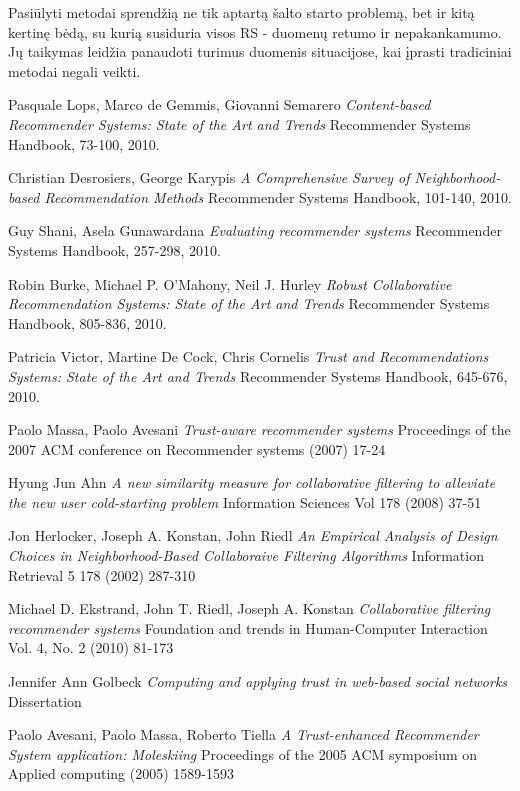 \documentclass{VUMIFInfMagistrinis}
\begin{document}
\newline
\indent
Pasiūlyti metodai sprendžią ne tik aptartą šalto starto problemą, bet ir kitą kertinę bėdą, su kurią susiduria visos RS - duomenų retumo ir nepakankamumo. Jų taikymas leidžia panaudoti turimus duomenis situacijose, kai įprasti tradiciniai metodai negali veikti.
\newpage
\begin{thebibliography}{9}
Pasquale Lops, Marco de Gemmis, Giovanni Semarero
\textit{Content-based Recommender Systems: State of the Art and Trends}
Recommender Systems Handbook, 73-100, 2010.
	
Christian Desrosiers, George Karypis
\textit{A Comprehensive Survey of Neighborhood-based Recommendation Methods}
Recommender Systems Handbook, 101-140, 2010.

Guy Shani, Asela Gunawardana
\textit{Evaluating recommender systems}
Recommender Systems Handbook, 257-298, 2010.
	
Robin Burke, Michael P. O'Mahony, Neil J. Hurley
\textit{Robust Collaborative Recommendation Systems: State of the Art and Trends}
Recommender Systems Handbook, 805-836, 2010.	
		
Patricia Victor, Martine De Cock, Chris Cornelis
\textit{Trust and Recommendations Systems: State of the Art and Trends}
Recommender Systems Handbook, 645-676, 2010.
	
Paolo Massa, Paolo Avesani
\textit{Trust-aware recommender systems}
Proceedings of the 2007 ACM conference on Recommender systems (2007) 17-24
	
Hyung Jun Ahn
\textit{A new similarity measure for collaborative filtering to alleviate the new user cold-starting problem}
Information Sciences Vol 178 (2008) 37-51
	
Jon Herlocker, Joseph A. Konstan, John Riedl
\textit{An Empirical Analysis of Design Choices in Neighborhood-Based Collaboraive Filtering Algorithms}
Information Retrieval 5 178 (2002) 287-310
	
Michael D. Ekstrand, John T. Riedl, Joseph A. Konstan
\textit{Collaborative filtering recommender systems}
Foundation and trends in Human-Computer Interaction Vol. 4, No. 2 (2010) 81-173

Jennifer Ann Golbeck
\textit{Computing and applying trust in web-based social networks}
Dissertation
	
Paolo Avesani, Paolo Massa, Roberto Tiella
\textit{A Trust-enhanced Recommender System application: Moleskiing}
Proceedings of the 2005 ACM symposium on Applied computing (2005) 1589-1593 
	

\end{thebibliography}
\end{document}

